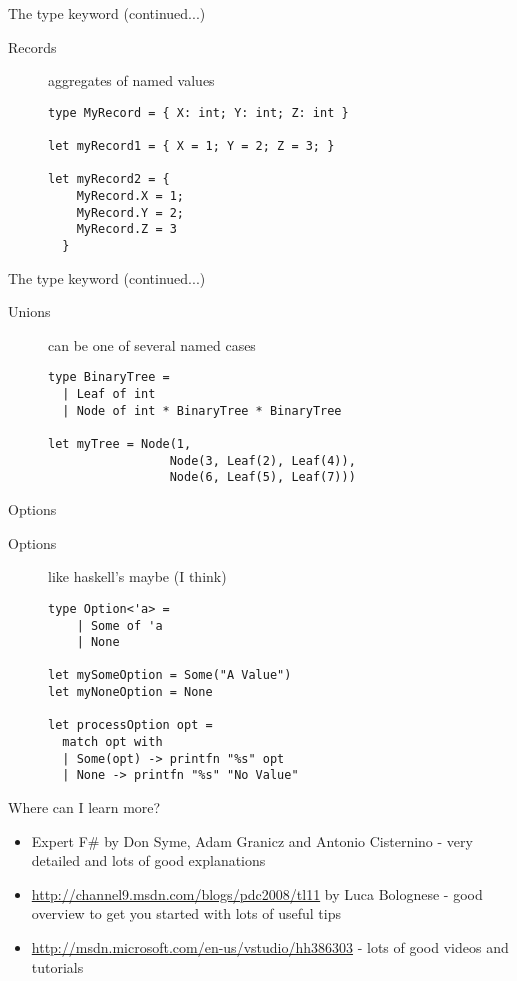 \documentclass[landscape]{slides}
\begin{document}
\begin{slide}{The type keyword (continued...)}
\begin{description}
\item[Records] aggregates of named values
\begin{verbatim}
type MyRecord = { X: int; Y: int; Z: int }

let myRecord1 = { X = 1; Y = 2; Z = 3; }

let myRecord2 = {
    MyRecord.X = 1; 
    MyRecord.Y = 2; 
    MyRecord.Z = 3 
  }
\end{verbatim}
\end{description}
\end{slide}

\begin{slide}{The type keyword (continued...)}
\begin{description}
\item[Unions] can be one of several named cases 
\begin{verbatim}
type BinaryTree =
  | Leaf of int
  | Node of int * BinaryTree * BinaryTree

let myTree = Node(1, 
                 Node(3, Leaf(2), Leaf(4)), 
                 Node(6, Leaf(5), Leaf(7)))
\end{verbatim}
\end{description}
\end{slide}

\begin{slide}{Options}
\begin{description} 
\item[Options] like haskell's maybe (I think)
\begin{verbatim}
type Option<'a> =
    | Some of 'a
    | None

let mySomeOption = Some("A Value")
let myNoneOption = None

let processOption opt =
  match opt with
  | Some(opt) -> printfn "%s" opt
  | None -> printfn "%s" "No Value"
\end{verbatim}
\end{description}
\end{slide}

\begin{slide}{Where can I learn more?}
\begin{itemize}
\item Expert F\# by Don Syme, Adam Granicz and Antonio Cisternino - very detailed and lots of good explanations
\item \href{http://channel9.msdn.com/blogs/pdc2008/tl11}{http://channel9.msdn.com/blogs/pdc2008/tl11} by Luca Bolognese - good overview to get you started with lots of useful tips
\item \href{http://msdn.microsoft.com/en-us/vstudio/hh386303}{http://msdn.microsoft.com/en-us/vstudio/hh386303} - lots of good videos and tutorials
\end{itemize}
\end{slide}
\end{document}
